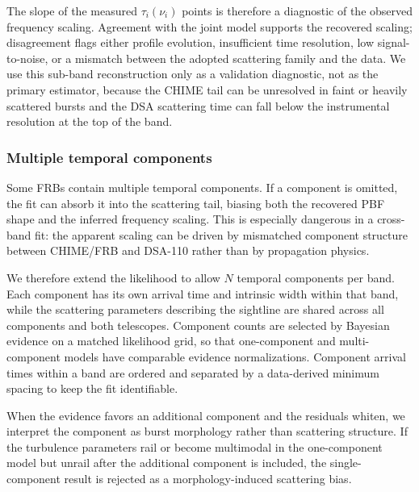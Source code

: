 The slope of the measured $\tau_i(\nu_i)$ points is therefore a diagnostic of
the observed frequency scaling. Agreement with the joint model supports the
recovered scaling; disagreement flags either profile evolution, insufficient
time resolution, low signal-to-noise, or a mismatch between the adopted
scattering family and the data. We use this sub-band reconstruction only as a
validation diagnostic, not as the primary estimator, because the CHIME tail can
be unresolved in faint or heavily scattered bursts and the DSA scattering time
can fall below the instrumental resolution at the top of the band.

\subsubsection{Multiple temporal components}
\label{sec:beta-multicomp}

Some FRBs contain multiple temporal components. If a component is omitted, the
fit can absorb it into the scattering tail, biasing both the recovered PBF shape
and the inferred frequency scaling. This is especially dangerous in a cross-band
fit: the apparent scaling can be driven by mismatched component structure
between CHIME/FRB and DSA-110 rather than by propagation physics.

We therefore extend the likelihood to allow $N$ temporal components per band.
Each component has its own arrival time and intrinsic width within that band,
while the scattering parameters describing the sightline are shared across all
components and both telescopes. Component counts are selected by Bayesian
evidence on a matched likelihood grid, so that one-component and multi-component
models have comparable evidence normalizations. Component arrival times within a
band are ordered and separated by a data-derived minimum spacing to keep the fit
identifiable.

When the evidence favors an additional component and the residuals whiten, we
interpret the component as burst morphology rather than scattering structure. If
the turbulence parameters rail or become multimodal in the one-component model
but unrail after the additional component is included, the single-component
result is rejected as a morphology-induced scattering bias.
